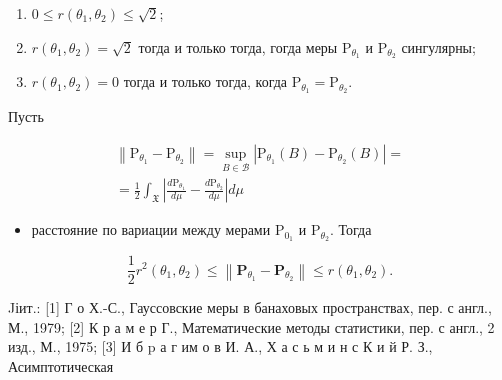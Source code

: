\documentclass[10pt]{article}
\begin{document}
\begin{enumerate}

  \item $0 \leqslant r\left(\theta_{1}, \theta_{2}\right) \leqslant \sqrt{2}$;



  \item $r\left(\theta_{1}, \theta_{2}\right)=\sqrt{2}$ тогда и только тогда, гогда меры $\mathrm{P}_{\theta_{1}}$ и $\mathrm{P}_{\theta_{2}}$ сингулярны;



  \item $r\left(\theta_{1}, \theta_{2}\right)=0$ тогда и только тогда, когда $\mathrm{P}_{\theta_{1}}=\mathrm{P}_{\theta_{2}}$.



\end{enumerate}



Пусть



\[

\begin{gathered}

\left\|\mathrm{P}_{\theta_{1}}-\mathrm{P}_{\theta_{2}}\right\|=\sup _{B \in \mathscr{B}}\left|\mathrm{P}_{\theta_{1}}(B)-\mathrm{P}_{\theta_{2}}(B)\right|= \\

=\frac{1}{2} \int_{\mathfrak{X}}\left|\frac{d \mathrm{P}_{\theta_{1}}}{d \mu}-\frac{d \mathrm{P}_{\theta_{2}}}{d \mu}\right| d \mu

\end{gathered}

\]



\begin{itemize}

  \item расстояние по вариации между мерами $\mathrm{P}_{0_{1}}$ и $\mathrm{P}_{\theta_{2}}$. Тогда

\end{itemize}



\[

\frac{1}{2} r^{2}\left(\theta_{1}, \theta_{2}\right) \leqslant\left\|\mathbf{P}_{\theta_{1}}-\mathbf{P}_{\theta_{2}}\right\| \leqslant r\left(\theta_{1}, \theta_{2}\right) .

\]



Jіит.: [1] Г о Х.-С., Гауссовские меры в банаховых пространствах, пер. с англ., М., 1979; [2] К р а м е р Г., Математические методы статистики, пер. с англ., 2 изд., М., 1975; [3] И б $\mathrm{p}$ а г им о в И. А., Х а с ь м и н с К и й Р. З., Асимптотическая
\end{document}

